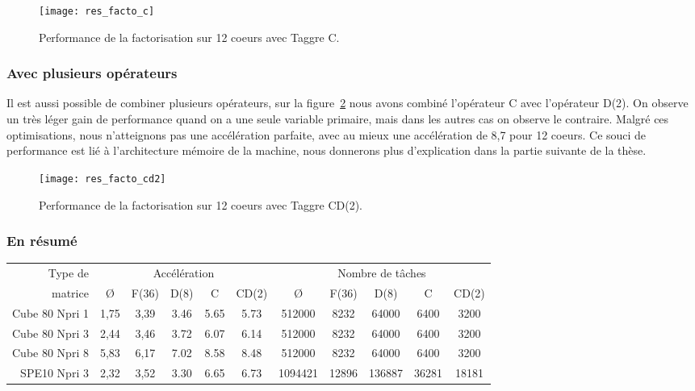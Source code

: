 \begin{figure}[!h]
  \centering
  \texttt{[image: res\_facto\_c]}
  \caption{Performance de la factorisation sur 12 coeurs avec Taggre C.}
  \label{fig:res_facto_c}
\end{figure}

\subsubsection{Avec plusieurs opérateurs}
Il est aussi possible de combiner plusieurs opérateurs, sur la figure~\ref{fig:res_facto_cd2} nous avons combiné l'opérateur C avec l'opérateur D(2).
%
On observe un très léger gain de performance quand on a une seule variable primaire, mais dans les autres cas on observe le contraire.
%
Malgré ces optimisations, nous n'atteignons pas une accélération parfaite, avec au mieux une accélération de 8,7 pour 12 coeurs.
%
Ce souci de performance est lié à l'architecture mémoire de la machine, nous donnerons plus d'explication dans la partie suivante de la thèse.
\begin{figure}[!h]
  \centering
  \texttt{[image: res\_facto\_cd2]}
  \caption{Performance de la factorisation sur 12 coeurs avec Taggre CD(2).}
  \label{fig:res_facto_cd2}
\end{figure}
\subsubsection{En résumé}

\begin{center}
  \begin{tabular}{|r|c|c|c|c|c|c|c|c|c|c|}
    \hline
    Type de  &  \multicolumn{5}{c|}{Accélération}  &  \multicolumn{5}{c|}{Nombre de tâches} \\
    matrice  &  \O & F(36) & D(8) & C & CD(2)  &  \O & F(36) & D(8) & C & CD(2)\\
    \hline
    Cube 80 Npri 1 & 1,75 & 3,39 & 3.46 & 5.65 & 5.73 & 512000  & 8232  & 64000  & 6400  & 3200 \\
    Cube 80 Npri 3 & 2,44 & 3,46 & 3.72 & 6.07 & 6.14 & 512000  & 8232  & 64000  & 6400  & 3200 \\
    Cube 80 Npri 8 & 5,83 & 6,17 & 7.02 & 8.58 & 8.48 & 512000  & 8232  & 64000  & 6400  & 3200 \\
    SPE10 Npri 3   & 2,32 & 3,52 & 3.30 & 6.65 & 6.73 & 1094421 & 12896 & 136887 & 36281 & 18181 \\
    \hline
  \end{tabular}
  \label{tab:facto_res}
\end{center}


